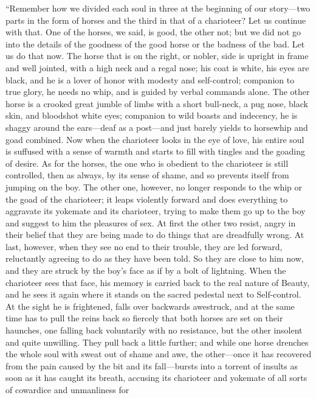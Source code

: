 “Remember how we divided each soul in three at the beginning of our 
story---two parts in the form of horses and the third in that of
a charioteer? Let us continue with that. One of the horses, we said, is
good, the other not; but we did not go into the details of the goodness
of the good horse or the badness of the bad. Let us do that now. The
horse that is on the right, or nobler, side is upright in frame and well
jointed, with a high neck and a regal nose; his coat is white, his eyes
are black, and he is a lover of honor with modesty and self-control;
companion to true glory, he needs no whip, and is guided by verbal
commands alone. The other horse is a crooked great jumble of
limbs with a short bull-neck, a pug nose, black skin, and bloodshot
white eyes; companion to wild boasts and indecency, he is shaggy around
the ears---deaf as a post---and just barely yields to horsewhip and goad
combined. Now when the charioteer looks in the eye of love, his entire
soul is suffused with a sense of warmth and starts to fill with tingles
and the goading of desire. As for the horses, the one who is obedient to
the charioteer is still controlled, then as always, by its sense 
of shame, and so prevents itself from jumping on the
boy. The other one, however, no longer responds to the whip or the goad
of the charioteer; it leaps violently forward and does everything to
aggravate its yokemate and its charioteer, trying to make them go up to
the boy and suggest to him the pleasures of sex. At first the other two
resist, angry in their belief that they are being made to do
things that are dreadfully wrong. At last, however, when they see no end
to their trouble, they are led forward, reluctantly agreeing to do as
they have been told. So they are close to him now, and they are struck
by the boy's face as if by a bolt of lightning. When the charioteer sees
that face, his memory is carried back to the real nature of Beauty, and
he sees it again where it stands on the sacred pedestal next to
Self-control. At the sight he is frightened, falls over backwards
awestruck, and at the same time has to pull the reins back so fiercely
that both horses are set on their haunches, one falling back
voluntarily with no resistance, but the other insolent and quite
unwilling. They pull back a little further; and while one horse drenches
the whole soul with sweat out of shame and awe, the other---once it has
recovered from the pain caused by the bit and its fall---bursts into a
torrent of insults as soon as it has caught its breath, accusing its
charioteer and yokemate of all sorts of cowardice and unmanliness for
